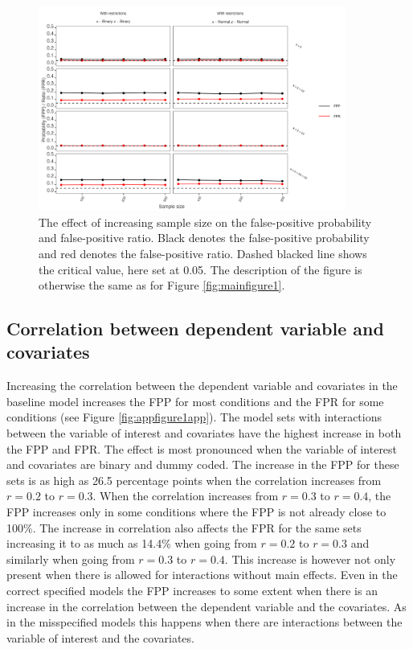 \begin{figure}[hbt!]
\includegraphics[width=0.9\textwidth]{R/Analysis/Result/Figures/Figure1D_with.jpeg}
\centering
\caption{The effect of increasing sample size on the false-positive probability and false-positive ratio. Black denotes the false-positive probability and red denotes the false-positive ratio. Dashed blacked line shows the critical value, here set at 0.05. The description of the figure is otherwise the same as for Figure \ref{fig:mainfigure1}.}
\label{fig:mainfigure4}
\end{figure}

\subsection{Correlation between dependent variable and covariates}
Increasing the correlation between the dependent variable and  covariates in the baseline model increases the FPP for most conditions and the FPR for some conditions (see Figure \ref{fig:appfigure1app}). The model sets with interactions between the variable of interest and covariates have the highest increase in both the FPP and FPR. The effect is most pronounced when the variable of interest and covariates are binary and dummy coded. The increase in the FPP for these sets is as high as 26.5 percentage points when the correlation increases from $r=0.2$ to $r=0.3$. When the correlation increases from $r=0.3$ to $r=0.4$, the FPP increases only in some conditions where the FPP is not already close to 100\%. The increase in correlation also affects the FPR for the same sets increasing it to as much as 14.4\% when going from $r=0.2$ to $r=0.3$ and similarly when going from $r=0.3$ to $r=0.4$. This increase is however not only present when there is allowed for interactions without main effects. Even in the correct specified models the FPP increases to some extent when there is an increase in the correlation between the dependent variable and the covariates. As in the misspecified models this happens when there are interactions between the variable of interest and the covariates. 


